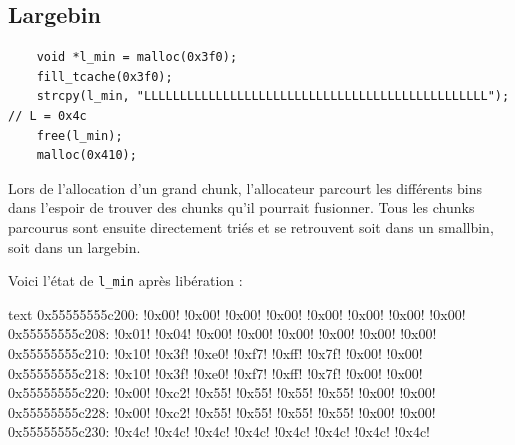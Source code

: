 \subsection{Largebin}
\begin{verbatim}
    void *l_min = malloc(0x3f0);
    fill_tcache(0x3f0);
    strcpy(l_min, "LLLLLLLLLLLLLLLLLLLLLLLLLLLLLLLLLLLLLLLLLLLLLLLL"); // L = 0x4c
    free(l_min);
    malloc(0x410);
\end{verbatim}

Lors de l'allocation d'un grand chunk, l'allocateur parcourt les différents bins dans
l'espoir de trouver des chunks qu'il pourrait fusionner.
Tous les chunks parcourus sont ensuite directement triés et se retrouvent soit dans un smallbin, soit dans
un largebin.

Voici l'état de \texttt{l\_min} après libération :

\begin{pwndbg}[x/56bx l\_min - 0x10]{text}
    0x55555555c200: !\textcolor{pwndbgbrown}{0x00}! !\textcolor{pwndbgbrown}{0x00}! !\textcolor{pwndbgbrown}{0x00}! !\textcolor{pwndbgbrown}{0x00}! !\textcolor{pwndbgbrown}{0x00}! !\textcolor{pwndbgbrown}{0x00}! !\textcolor{pwndbgbrown}{0x00}! !\textcolor{pwndbgbrown}{0x00}!
    0x55555555c208: !\textcolor{pwndbgred}{0x01}! !\textcolor{pwndbgred}{0x04}! !\textcolor{pwndbgred}{0x00}! !\textcolor{pwndbgred}{0x00}! !\textcolor{pwndbgred}{0x00}! !\textcolor{pwndbgred}{0x00}! !\textcolor{pwndbgred}{0x00}! !\textcolor{pwndbgred}{0x00}!
    0x55555555c210: !\textcolor{pwndbgblue}{0x10}! !\textcolor{pwndbgblue}{0x3f}! !\textcolor{pwndbgblue}{0xe0}! !\textcolor{pwndbgblue}{0xf7}! !\textcolor{pwndbgblue}{0xff}! !\textcolor{pwndbgblue}{0x7f}! !\textcolor{pwndbgblue}{0x00}! !\textcolor{pwndbgblue}{0x00}!
    0x55555555c218: !\textcolor{pwndbgyellow}{0x10}! !\textcolor{pwndbgyellow}{0x3f}! !\textcolor{pwndbgyellow}{0xe0}! !\textcolor{pwndbgyellow}{0xf7}! !\textcolor{pwndbgyellow}{0xff}! !\textcolor{pwndbgyellow}{0x7f}! !\textcolor{pwndbgyellow}{0x00}! !\textcolor{pwndbgyellow}{0x00}!
    0x55555555c220: !\textcolor{pwndbgpurple}{0x00}! !\textcolor{pwndbgpurple}{0xc2}! !\textcolor{pwndbgpurple}{0x55}! !\textcolor{pwndbgpurple}{0x55}! !\textcolor{pwndbgpurple}{0x55}! !\textcolor{pwndbgpurple}{0x55}! !\textcolor{pwndbgpurple}{0x00}! !\textcolor{pwndbgpurple}{0x00}!
    0x55555555c228: !\textcolor{pwndbgorange}{0x00}! !\textcolor{pwndbgorange}{0xc2}! !\textcolor{pwndbgorange}{0x55}! !\textcolor{pwndbgorange}{0x55}! !\textcolor{pwndbgorange}{0x55}! !\textcolor{pwndbgorange}{0x55}! !\textcolor{pwndbgorange}{0x00}! !\textcolor{pwndbgorange}{0x00}!
    0x55555555c230: !\textcolor{pwndbgdarkgreen}{0x4c}! !\textcolor{pwndbgdarkgreen}{0x4c}! !\textcolor{pwndbgdarkgreen}{0x4c}! !\textcolor{pwndbgdarkgreen}{0x4c}! !\textcolor{pwndbgdarkgreen}{0x4c}! !\textcolor{pwndbgdarkgreen}{0x4c}! !\textcolor{pwndbgdarkgreen}{0x4c}! !\textcolor{pwndbgdarkgreen}{0x4c}!
\end{pwndbg}


